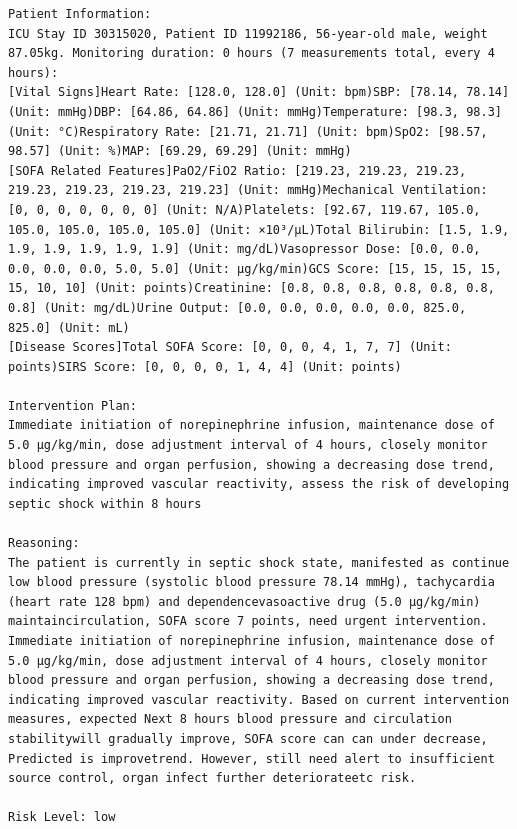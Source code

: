 \documentclass{article}
\begin{document}
\begin{lstlisting}[caption={Result for Patient 30315020}, label={lst:30315020}]
Patient Information:
ICU Stay ID 30315020, Patient ID 11992186, 56-year-old male, weight 87.05kg. Monitoring duration: 0 hours (7 measurements total, every 4 hours):
[Vital Signs]Heart Rate: [128.0, 128.0] (Unit: bpm)SBP: [78.14, 78.14] (Unit: mmHg)DBP: [64.86, 64.86] (Unit: mmHg)Temperature: [98.3, 98.3] (Unit: °C)Respiratory Rate: [21.71, 21.71] (Unit: bpm)SpO2: [98.57, 98.57] (Unit: %)MAP: [69.29, 69.29] (Unit: mmHg)
[SOFA Related Features]PaO2/FiO2 Ratio: [219.23, 219.23, 219.23, 219.23, 219.23, 219.23, 219.23] (Unit: mmHg)Mechanical Ventilation: [0, 0, 0, 0, 0, 0, 0] (Unit: N/A)Platelets: [92.67, 119.67, 105.0, 105.0, 105.0, 105.0, 105.0] (Unit: ×10³/μL)Total Bilirubin: [1.5, 1.9, 1.9, 1.9, 1.9, 1.9, 1.9] (Unit: mg/dL)Vasopressor Dose: [0.0, 0.0, 0.0, 0.0, 0.0, 5.0, 5.0] (Unit: μg/kg/min)GCS Score: [15, 15, 15, 15, 15, 10, 10] (Unit: points)Creatinine: [0.8, 0.8, 0.8, 0.8, 0.8, 0.8, 0.8] (Unit: mg/dL)Urine Output: [0.0, 0.0, 0.0, 0.0, 0.0, 825.0, 825.0] (Unit: mL)
[Disease Scores]Total SOFA Score: [0, 0, 0, 4, 1, 7, 7] (Unit: points)SIRS Score: [0, 0, 0, 0, 1, 4, 4] (Unit: points)

Intervention Plan:
Immediate initiation of norepinephrine infusion, maintenance dose of 5.0 μg/kg/min, dose adjustment interval of 4 hours, closely monitor blood pressure and organ perfusion, showing a decreasing dose trend, indicating improved vascular reactivity, assess the risk of developing septic shock within 8 hours

Reasoning:
The patient is currently in septic shock state, manifested as continue low blood pressure (systolic blood pressure 78.14 mmHg), tachycardia (heart rate 128 bpm) and dependencevasoactive drug (5.0 μg/kg/min) maintaincirculation, SOFA score 7 points, need urgent intervention. Immediate initiation of norepinephrine infusion, maintenance dose of 5.0 μg/kg/min, dose adjustment interval of 4 hours, closely monitor blood pressure and organ perfusion, showing a decreasing dose trend, indicating improved vascular reactivity. Based on current intervention measures, expected Next 8 hours blood pressure and circulation stabilitywill gradually improve, SOFA score can can under decrease, Predicted is improvetrend. However, still need alert to insufficient source control, organ infect further deteriorateetc risk.

Risk Level: low
\end{lstlisting}
\end{document}
